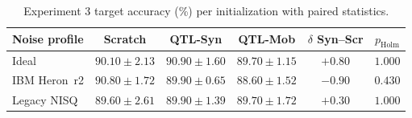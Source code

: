 \begin{table}[ht]
\centering
\caption{Experiment 3 target accuracy (\%) per initialization with paired statistics.}
\label{tab:exp3_stats}
\begin{tabular}{lccccc}
\toprule
\textbf{Noise profile} & \textbf{Scratch} & \textbf{QTL-Syn} & \textbf{QTL-Mob} & \textbf{$\delta$ Syn--Scr} & \textbf{$p_\text{Holm}$} \\
\midrule
Ideal & $90.10 \pm 2.13$ & $90.90 \pm 1.60$ & $89.70 \pm 1.15$ & $+0.80$ & $1.000$ \\
IBM Heron~r2 & $90.80 \pm 1.72$ & $89.90 \pm 0.65$ & $88.60 \pm 1.52$ & $-0.90$ & $0.430$ \\
Legacy NISQ & $89.60 \pm 2.61$ & $89.90 \pm 1.39$ & $89.70 \pm 1.72$ & $+0.30$ & $1.000$ \\
\bottomrule
\end{tabular}
\end{table}
